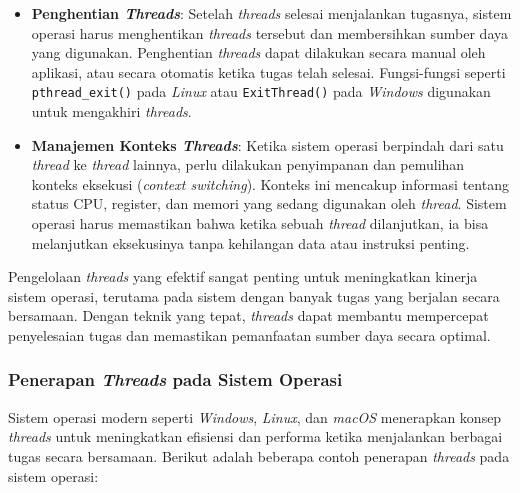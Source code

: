 \documentclass[12pt]{article}
\begin{document}
\begin{itemize}
    \item \textbf{Penghentian \textit{Threads}}: Setelah \textit{threads} selesai menjalankan tugasnya, sistem operasi harus menghentikan \textit{threads} tersebut dan membersihkan sumber daya yang digunakan. Penghentian \textit{threads} dapat dilakukan secara manual oleh aplikasi, atau secara otomatis ketika tugas telah selesai. Fungsi-fungsi seperti \texttt{pthread\_exit()} pada \textit{Linux} atau \texttt{ExitThread()} pada \textit{Windows} digunakan untuk mengakhiri \textit{threads}.

    \item \textbf{Manajemen Konteks \textit{Threads}}: Ketika sistem operasi berpindah dari satu \textit{thread} ke \textit{thread} lainnya, perlu dilakukan penyimpanan dan pemulihan konteks eksekusi (\textit{context switching}). Konteks ini mencakup informasi tentang status CPU, register, dan memori yang sedang digunakan oleh \textit{thread}. Sistem operasi harus memastikan bahwa ketika sebuah \textit{thread} dilanjutkan, ia bisa melanjutkan eksekusinya tanpa kehilangan data atau instruksi penting.
\end{itemize}

Pengelolaan \textit{threads} yang efektif sangat penting untuk meningkatkan kinerja sistem operasi, terutama pada sistem dengan banyak tugas yang berjalan secara bersamaan. Dengan teknik yang tepat, \textit{threads} dapat membantu mempercepat penyelesaian tugas dan memastikan pemanfaatan sumber daya secara optimal.

\subsubsection{Penerapan \textit{Threads} pada Sistem Operasi}
Sistem operasi modern seperti \textit{Windows}, \textit{Linux}, dan \textit{macOS} menerapkan konsep \textit{threads} untuk meningkatkan efisiensi dan performa ketika menjalankan berbagai tugas secara bersamaan. Berikut adalah beberapa contoh penerapan \textit{threads} pada sistem operasi:
\end{document}
